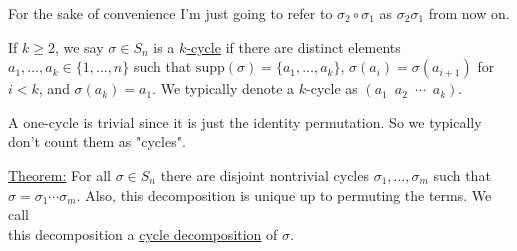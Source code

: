 \documentclass{book}
\newcommand{\hTwo}{%
\color{Black}%
   \fontsize{13}{15}\selectfont%
}
\newcommand{\exTwo}{%
   \color{Purple}%
   \fontsize{13}{15}\selectfont%
}
\newcommand{\udefine}[1]{{%
   \setulcolor{Red}%
   \setul{0.14em}{0.07em}%
   \ul{#1}%
}}
\newcommand{\gap}{\phantom{2}}
\newcommand{\supp}{\mathrm{supp}}
\newcommand{\retTwo}{\hfill\bigbreak}
\begin{document}
\hTwo For the sake of convenience I'm just going to refer to $\sigma_2 \circ \sigma_1$ as $\sigma_2 \sigma_1$ from now on.\retTwo

If $k \geq 2$, we say $\sigma \in S_n$ is a \udefine{$k$-cycle} if there are distinct elements $a_1, \ldots, a_k \in \{1, \ldots, n\}$ such that $\supp(\sigma) = \{a_1, \ldots, a_k\}$, $\sigma(a_i) = \sigma(a_{i+1})$ for $i < k$, and $\sigma(a_k) = a_1$. We typically denote a $k$-cycle as $(a_1\gap a_2\gap \cdots\gap a_k)$.\retTwo

A one-cycle is trivial since it is just the identity permutation. So we typically don't count them as "cycles".\retTwo

\exTwo\ul{Theorem:} For all $\sigma \in S_n$ there are disjoint nontrivial cycles $\sigma_1, \ldots, \sigma_m$ such that\\ $\sigma= \sigma_1 \cdots \sigma_m$. Also, this decomposition is unique up to permuting the terms. We call\\ this decomposition a \udefine{cycle decomposition} of $\sigma$.
\end{document}
